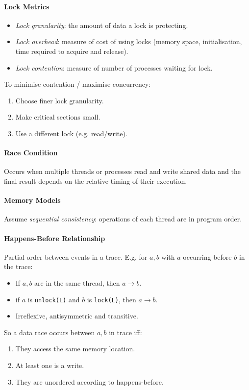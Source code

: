 \documentclass[twocolumn,english]{article}
\begin{document}
\paragraph{Lock Metrics}
\begin{itemize}
\item \emph{Lock granularity}: the amount of data a lock is protecting.
\item \emph{Lock overhead}: measure of cost of using locks (memory space,
initialisation, time required to acquire and release).
\item \emph{Lock contention}: measure of number of processes waiting for
lock.
\end{itemize}
To minimise contention / maximise concurrency:
\begin{enumerate}
\item Choose finer lock granularity.
\item Make critical sections small.
\item Use a different lock (e.g. read/write).
\end{enumerate}

\paragraph{Race Condition}

Occurs when multiple threads or processes read and write shared data
and the final result depends on the relative timing of their execution.

\paragraph{Memory Models}

Assume \emph{sequential consistency}: operations of each thread are
in program order.

\paragraph{Happens-Before Relationship}

Partial order between events in a trace. E.g. for $a,b$ with $a$
occurring before $b$ in the trace:
\begin{itemize}
\item If $a,b$ are in the same thread, then $a\rightarrow b$.
\item if $a$ is \texttt{unlock(L)} and $b$ is \texttt{lock(L)}, then $a\rightarrow b$.
\item Irreflexive, antisymmetric and transitive.
\end{itemize}
So a data race occurs between $a,b$ in trace iff:
\begin{enumerate}
\item They access the same memory location.
\item At least one is a write.
\item They are unordered according to happens-before.
\end{enumerate}
\end{document}
